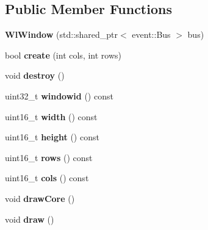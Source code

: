 \subsection*{Public Member Functions}
\begin{DoxyCompactItemize}
\item 
\mbox{\label{classwlwin_1_1WlWindow_ab644c594c6e7234c7bef9e7b72f2a185}} 
{\bfseries Wl\+Window} (std\+::shared\+\_\+ptr$<$ event\+::\+Bus $>$ bus)
\item 
\mbox{\label{classwlwin_1_1WlWindow_a2cd72ed4d320e1ec97c182dfa705c219}} 
bool {\bfseries create} (int cols, int rows)
\item 
\mbox{\label{classwlwin_1_1WlWindow_a6b78e70a434a498f99935023d7bd03db}} 
void {\bfseries destroy} ()
\item 
\mbox{\label{classwlwin_1_1WlWindow_a1c00df2243aa8f6657ca85ac97cac1f5}} 
uint32\+\_\+t {\bfseries windowid} () const
\item 
\mbox{\label{classwlwin_1_1WlWindow_a58ef77a654094615cedb11788c5bcc21}} 
uint16\+\_\+t {\bfseries width} () const
\item 
\mbox{\label{classwlwin_1_1WlWindow_af3d20a034f11cfa7d47ce1e8c4ee5976}} 
uint16\+\_\+t {\bfseries height} () const
\item 
\mbox{\label{classwlwin_1_1WlWindow_ae505414d4daa195e9cd4843c727f0b98}} 
uint16\+\_\+t {\bfseries rows} () const
\item 
\mbox{\label{classwlwin_1_1WlWindow_a654c717ca253e9a4a9b667731d7c7f8d}} 
uint16\+\_\+t {\bfseries cols} () const
\item 
\mbox{\label{classwlwin_1_1WlWindow_a0e5d18a799d13d7f89b28d76f90ad3cc}} 
void {\bfseries draw\+Core} ()
\item 
\mbox{\label{classwlwin_1_1WlWindow_a2182298fb0f611951cc08914bf7b3d00}} 
void {\bfseries draw} ()
\item 

\end{DoxyCompactItemize}
